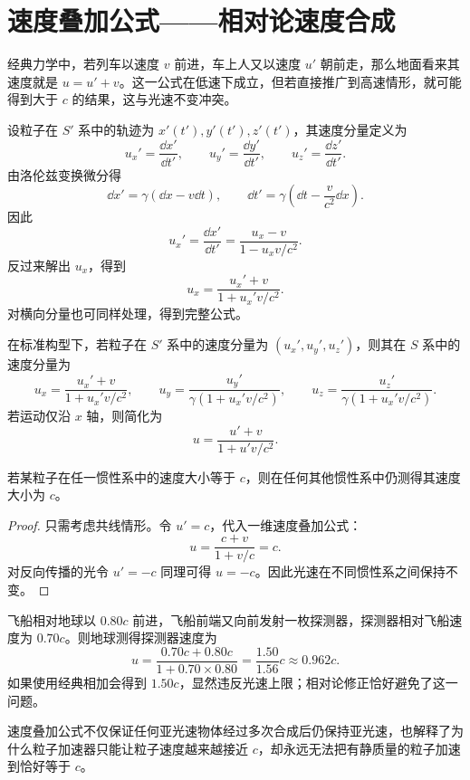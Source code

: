 \section{速度叠加公式——相对论速度合成}

经典力学中，若列车以速度 $v$ 前进，车上人又以速度 $u'$ 朝前走，那么地面看来其速度就是 $u=u'+v$。这一公式在低速下成立，但若直接推广到高速情形，就可能得到大于 $c$ 的结果，这与光速不变冲突。

设粒子在 $S'$ 系中的轨迹为 $x'(t'),y'(t'),z'(t')$，其速度分量定义为
\[
u_x'=\frac{\dd x'}{\dd t'},
\qquad
u_y'=\frac{\dd y'}{\dd t'},
\qquad
u_z'=\frac{\dd z'}{\dd t'}.
\]
由洛伦兹变换微分得
\[
\dd x'=\gamma(\dd x-v\dd t),
\qquad
\dd t'=\gamma\left(\dd t-\frac{v}{c^2}\dd x\right).
\]
因此
\[
u_x'=\frac{\dd x'}{\dd t'}=\frac{u_x-v}{1-u_xv/c^2}.
\]
反过来解出 $u_x$，得到
\[
u_x=\frac{u_x'+v}{1+u_x'v/c^2}.
\]
对横向分量也可同样处理，得到完整公式。

\begin{law}[相对论速度叠加公式]
在标准构型下，若粒子在 $S'$ 系中的速度分量为 $(u_x',u_y',u_z')$，则其在 $S$ 系中的速度分量为
\[
u_x=\frac{u_x'+v}{1+u_x'v/c^2},
\qquad
u_y=\frac{u_y'}{\gamma\left(1+u_x'v/c^2\right)},
\qquad
u_z=\frac{u_z'}{\gamma\left(1+u_x'v/c^2\right)}.
\]
若运动仅沿 $x$ 轴，则简化为
\[
u=\frac{u'+v}{1+u'v/c^2}.
\]
\end{law}

\begin{theorem}[光速是速度叠加公式的不动点]
若某粒子在任一惯性系中的速度大小等于 $c$，则在任何其他惯性系中仍测得其速度大小为 $c$。
\end{theorem}

\begin{proof}
只需考虑共线情形。令 $u'=c$，代入一维速度叠加公式：
\[
u=\frac{c+v}{1+v/c}=c.
\]
对反向传播的光令 $u'=-c$ 同理可得 $u=-c$。因此光速在不同惯性系之间保持不变。
\end{proof}

\begin{example}[两次高速推进后的速度]
飞船相对地球以 $0.80c$ 前进，飞船前端又向前发射一枚探测器，探测器相对飞船速度为 $0.70c$。则地球测得探测器速度为
\[
u=\frac{0.70c+0.80c}{1+0.70\times 0.80}=\frac{1.50}{1.56}c\approx 0.962c.
\]
如果使用经典相加会得到 $1.50c$，显然违反光速上限；相对论修正恰好避免了这一问题。
\end{example}

\begin{remark}
速度叠加公式不仅保证任何亚光速物体经过多次合成后仍保持亚光速，也解释了为什么粒子加速器只能让粒子速度越来越接近 $c$，却永远无法把有静质量的粒子加速到恰好等于 $c$。
\end{remark}

